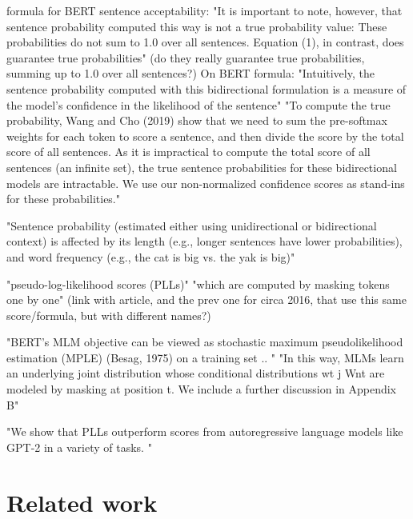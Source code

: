 \citet{lau2020furiously} formula for BERT sentence acceptability:
"It is important to note, however, that
sentence probability computed this way is not
a true probability value: These probabilities do
not sum to 1.0 over all sentences. Equation (1),
in contrast, does guarantee true probabilities" \citep{lau2020furiously}
(do they really guarantee true probabilities, summing up to 1.0 over all sentences?)
On BERT formula:
"Intuitively, the sentence probability computed
with this bidirectional formulation is a measure of the model’s confidence in the likelihood of the
sentence"\citep{lau2020furiously}
"To compute the true probability, Wang and
Cho (2019) show that we need to sum the
pre-softmax weights for each token to score a
sentence, and then divide the score by the total
score of all sentences. As it is impractical to
compute the total score of all sentences (an
infinite set), the true sentence probabilities for
these bidirectional models are intractable. We use
our non-normalized confidence scores as stand-ins
for these probabilities."\citep{lau2020furiously}
 
"Sentence probability (estimated either using
unidirectional or bidirectional context) is affected
by its length (e.g., longer sentences have lower
probabilities), and word frequency (e.g., the cat is
big vs. the yak is big)" \citep{lau2020furiously}


"pseudo-log-likelihood scores (PLLs)" "which are computed by masking tokens one by one" \citep{salazar2020masked}
(link with \citet{lau2020furiously} article, and the prev one for circa 2016, that use this same score/formula, but with different names?)

"BERT’s MLM objective can be viewed as stochastic maximum pseudolikelihood estimation (MPLE) \citet{wang2019bert}(Besag, 1975) on a training set  .. " \citep{salazar2020masked}
"In this way, MLMs learn an underlying joint distribution whose conditional distributions wt j Wnt are modeled by masking at position t. We include
a further discussion in Appendix B" \citep{salazar2020masked}

"We show that PLLs outperform scores from autoregressive language models like GPT-2 in a variety of tasks. " \citep{salazar2020masked}

\pagebreak



\chapter{Related work}


